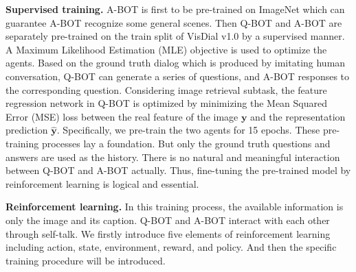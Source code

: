 \documentclass[review]{elsarticle}
\begin{document}
	\textbf{Supervised training.} A-BOT is first to be pre-trained on ImageNet which can guarantee A-BOT recognize some general scenes. Then Q-BOT and A-BOT are separately pre-trained on the train split of VisDial v1.0 \cite{DBLP:conf/iccv/DasKMLB17} by a supervised manner. 
	A Maximum Likelihood Estimation (MLE) objective is used to optimize the agents. 
	Based on the ground truth dialog which is produced by imitating human conversation, Q-BOT can generate a series of questions, and A-BOT responses to the corresponding question. 
	Considering image retrieval subtask, the feature regression network in Q-BOT is optimized by minimizing the Mean Squared Error (MSE) loss between the real feature of the image $\textbf{y}$ and the representation prediction $\mathbf{\hat{y}}$. 
	Specifically, we pre-train the two agents for 15 epochs. These pre-training processes lay a foundation. But only the ground truth questions and answers are used as the history. There is no natural and meaningful interaction between Q-BOT and A-BOT actually.
	Thus, fine-tuning the pre-trained model by reinforcement learning is logical and essential.
	
	\textbf{Reinforcement learning.} In this training process, the available information is only the image and its caption. Q-BOT and A-BOT interact with each other through self-talk. 
	We firstly introduce five elements of reinforcement learning including action, state, environment, reward, and policy. And then the specific training procedure will be introduced.
	
\end{document}
